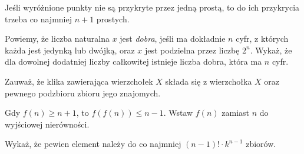 
\begin{hints_list}
	\item *
	\item Jeśli wyróżnione punkty nie są przykryte przez jedną prostą, to do ich przykrycia trzeba co najmniej $n + 1$ prostych.
	\item Powiemy, że liczba naturalna $x$ jest \textit{dobra}, jeśli ma dokładnie $n$ cyfr, z których każda jest jedynką lub dwójką, oraz $x$ jest podzielna przez liczbę $2^n$. Wykaż, że dla dowolnej dodatniej liczby całkowitej istnieje liczba dobra, która ma $n$ cyfr.
	\item Zauważ, że klika zawierająca wierzchołek $X$ składa się z wierzchołka $X$ oraz pewnego podzbioru zbioru jego znajomych.
	\item Gdy $f(n) \geqslant n + 1$, to $f(f(n)) \leqslant n - 1$. Wstaw $f(n)$ zamiast $n$ do wyjściowej nierówności.
	\item Wykaż, że pewien element należy do co najmniej $(n - 1)! \cdot k^{n - 1}$ zbiorów.
\end{hints_list}